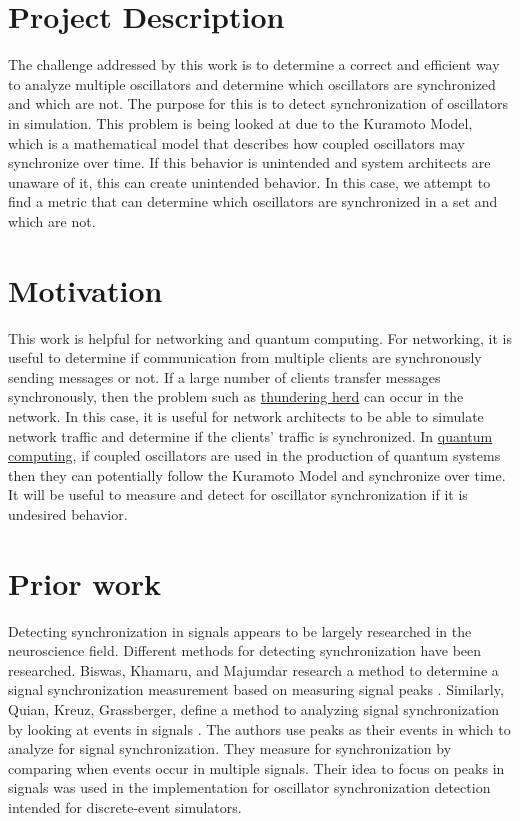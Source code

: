 \documentclass{article}
\begin{document}
\section{Project Description} %

The challenge addressed by this work is to determine a correct and efficient way to analyze multiple oscillators and determine which oscillators are synchronized and which are not. The purpose for this is to detect synchronization of oscillators in simulation. This problem is being looked at due to the Kuramoto Model, which is a mathematical model that describes how coupled oscillators may synchronize over time. If this behavior is unintended and system architects are unaware of it, this can create unintended behavior. In this case, we attempt to find a metric that can determine which oscillators are synchronized in a set and which are not.

\section{Motivation} %
This work is helpful for networking and quantum computing. For networking, it is useful to determine if communication from multiple clients are synchronously sending messages or not. If a large number of clients transfer messages synchronously, then the problem such as \href{https://en.wikipedia.org/wiki/Thundering_herd_problem}{thundering herd} can occur in the network. In this case, it is useful for network architects to be able to simulate network traffic and determine if the clients' traffic is synchronized. In \href{https://en.wikipedia.org/wiki/Quantum_computing}{quantum computing}, if coupled oscillators are used in the production of quantum systems then they can potentially follow the Kuramoto Model and synchronize over time. It will be useful to measure and detect for oscillator synchronization if it is undesired behavior.

\section{Prior work} %
Detecting synchronization in signals appears to be largely researched in the neuroscience field. Different methods for detecting synchronization have been researched. Biswas, Khamaru, and Majumdar research a method to determine a signal synchronization measurement based on measuring signal peaks \cite{biswas_2014}. Similarly, Quian, Kreuz, Grassberger, define a method to analyzing signal synchronization by looking at events in signals \cite{quian_2002}. The authors use peaks as their events in which to analyze for signal synchronization. They measure for synchronization by comparing when events occur in multiple signals. Their idea to focus on peaks in signals was used in the implementation for oscillator synchronization detection intended for discrete-event simulators.
\end{document}
